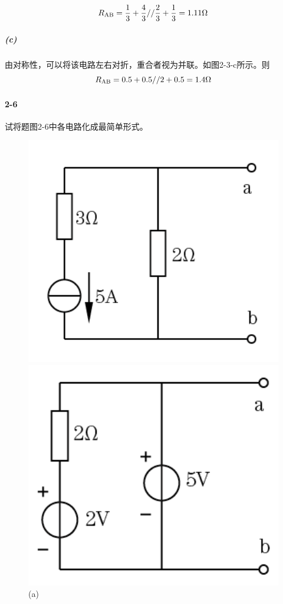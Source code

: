 \documentclass[hyperref, UTF8]{ctexart}
\begin{document}
$$R_{\rm AB}=
\frac{1}{3}+\frac{4}{3}//\frac{2}{3}+\frac{1}{3}=1.11\Omega$$
\subparagraph{(c)}
由对称性，可以将该电路左右对折，重合者视为并联。如图2-3-c所示。则
$$R_{\rm AB}=0.5+0.5//2+0.5=1.4\Omega$$

\paragraph{2-6} \label{2-6}
试将题图2-6中各电路化成最简单形式。

\begin{figure}[!htb]
  \centering
  \begin{minipage}[t]{0.212\textwidth}
    \centering
    \includegraphics[width=1\textwidth]{p2-6-a.png}
    \caption*{(a)}
  \end{minipage}
  \begin{minipage}[t]{0.195\textwidth}
    \centering
    \includegraphics[width=1\textwidth]{p2-6-b.png}

\end{minipage}
\end{figure}
\end{document}
